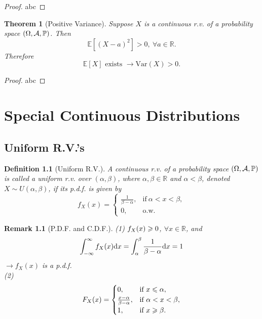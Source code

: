 \documentclass[openany,12pt]{book}
\newtheorem{theorem}{Theorem}[chapter]
\newtheorem{remark}{Remark}[chapter]
\newtheorem{definition}{Definition}[chapter]
\begin{document}
\begin{proof}
  abc
\end{proof}

\begin{theorem}[Positive Variance]
  Suppose $X$ is a continuous r.v. of a probability space $(\Omega,\mathcal{A},\mathbb{P})$. Then
  $$
    \mathbb{E}[(X-a)^2]>0,~\forall a\in\mathbb{R}.
  $$
  Therefore
  $$
    \mathbb{E}[X] \text{ exists }\to   \mathrm{Var}(X)>0.
  $$
\end{theorem}

\begin{proof}
  abc
\end{proof}

\chapter{Special Continuous Distributions}
\section{Uniform R.V.'s}

\begin{definition}[Uniform R.V.]
  A continuous r.v. of a probability space $(\Omega,\mathcal{A},\mathbb{P})$ is called a uniform r.v. over $(\alpha,\beta)$, where $\alpha,\beta\in\mathbb{R}$ and $\alpha<\beta$, denoted $X\sim U(\alpha,\beta)$, if its p.d.f. is given by
  $$
    f_{X}(x)=
    \begin{cases}
      \frac{1}{\beta - \alpha},&\text{if}~ \alpha < x < \beta, \\
      0, &\text{o.w.}
    \end{cases}
  $$
\end{definition}

\begin{remark}[P.D.F. and C.D.F.]
  (1) $f_X(x)\geqslant0$, $\forall x\in\mathbb{R}$, and
  $$
    \int_{-\infty}^{\infty}{f_X(x)}\mathrm{d} x=\int_{\alpha}^{\beta}\frac{1}{\beta-\alpha}\mathrm{d} x=1
  $$
  $\to f_X(x)$ is a p.d.f.\\
  (2)
  $$
    F_{X}(x)=
    \begin{cases}
      0,                                 &\text{if}~ x \leqslant \alpha,       \\
      \frac{x - \alpha}{\beta - \alpha}, &\text{if}~ \alpha < x < \beta, \\
      1,                                 &\text{if}~ x \geqslant \beta.        \\
    \end{cases}
  $$
\end{remark}
\end{document}
